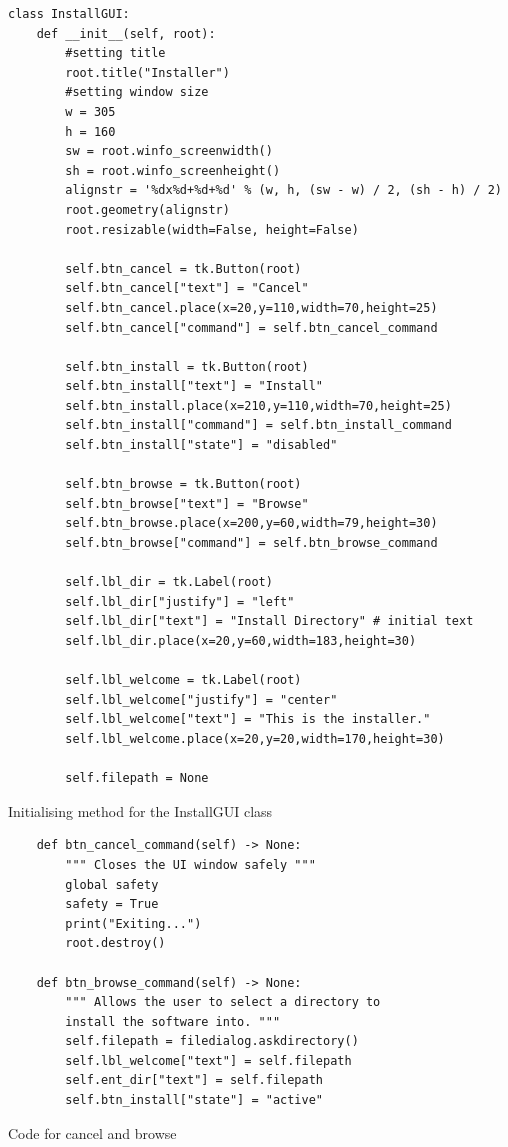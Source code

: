 \documentclass[11pt]{article}
\begin{document}
        \newpage
        \begin{listing}[!ht]
            \begin{verbatim}
class InstallGUI:
    def __init__(self, root):
        #setting title
        root.title("Installer")
        #setting window size
        w = 305
        h = 160
        sw = root.winfo_screenwidth()
        sh = root.winfo_screenheight()
        alignstr = '%dx%d+%d+%d' % (w, h, (sw - w) / 2, (sh - h) / 2)
        root.geometry(alignstr)
        root.resizable(width=False, height=False)

        self.btn_cancel = tk.Button(root)
        self.btn_cancel["text"] = "Cancel"
        self.btn_cancel.place(x=20,y=110,width=70,height=25)
        self.btn_cancel["command"] = self.btn_cancel_command

        self.btn_install = tk.Button(root)
        self.btn_install["text"] = "Install"
        self.btn_install.place(x=210,y=110,width=70,height=25)
        self.btn_install["command"] = self.btn_install_command
        self.btn_install["state"] = "disabled"

        self.btn_browse = tk.Button(root)
        self.btn_browse["text"] = "Browse"
        self.btn_browse.place(x=200,y=60,width=79,height=30)
        self.btn_browse["command"] = self.btn_browse_command

        self.lbl_dir = tk.Label(root)
        self.lbl_dir["justify"] = "left"
        self.lbl_dir["text"] = "Install Directory" # initial text
        self.lbl_dir.place(x=20,y=60,width=183,height=30)

        self.lbl_welcome = tk.Label(root)
        self.lbl_welcome["justify"] = "center"
        self.lbl_welcome["text"] = "This is the installer."
        self.lbl_welcome.place(x=20,y=20,width=170,height=30)
        
        self.filepath = None
            \end{verbatim}
            \caption{Initialising method for the InstallGUI class}
            \label{sc:install_gui_init_sc_c1}
        \end{listing}


        \newpage
        \begin{listing}[!ht]
            \begin{verbatim}
    def btn_cancel_command(self) -> None:
        """ Closes the UI window safely """
        global safety
        safety = True
        print("Exiting...")
        root.destroy()

    def btn_browse_command(self) -> None:
        """ Allows the user to select a directory to 
        install the software into. """
        self.filepath = filedialog.askdirectory()
        self.lbl_welcome["text"] = self.filepath
        self.ent_dir["text"] = self.filepath
        self.btn_install["state"] = "active"
            \end{verbatim}
            \caption{Code for cancel and browse}
            \label{sc:cancel_and_browse_btns_sc_c1}
        \end{listing}
\end{document}
